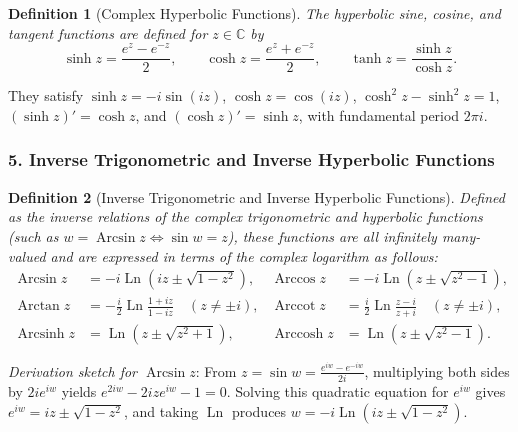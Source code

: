 \documentclass[11pt,a4paper]{article}
\theoremstyle{definitionbreak}
\newtheorem{definition}{Definition}
\theoremstyle{examplebreak}
\theoremstyle{plain}
\begin{document}
\begin{definition}[Complex Hyperbolic Functions]
The hyperbolic sine, cosine, and tangent functions are defined for $z \in \mathbb{C}$ by
\[
    \sinh z = \frac{e^z - e^{-z}}{2}, \qquad \cosh z = \frac{e^z + e^{-z}}{2}, \qquad \tanh z = \frac{\sinh z}{\cosh z}.
\]
\end{definition}

They satisfy $\sinh z = -i\sin(iz)$, $\cosh z = \cos(iz)$, $\cosh^2 z - \sinh^2 z = 1$, $(\sinh z)' = \cosh z$, and $(\cosh z)' = \sinh z$, with fundamental period $2\pi i$.

\subsubsection{5. Inverse Trigonometric and Inverse Hyperbolic Functions}

\begin{definition}[Inverse Trigonometric and Inverse Hyperbolic Functions]
Defined as the inverse relations of the complex trigonometric and hyperbolic functions (such as $w = \operatorname{Arcsin} z \iff \sin w = z$), these functions are all infinitely many-valued and are expressed in terms of the complex logarithm as follows:
\begin{align*}
    \operatorname{Arcsin} z &= -i\operatorname{Ln}\left(iz \pm \sqrt{1 - z^2}\right), & \operatorname{Arccos} z &= -i\operatorname{Ln}\left(z \pm \sqrt{z^2 - 1}\right), \\[6pt]
    \operatorname{Arctan} z &= -\frac{i}{2}\operatorname{Ln}\frac{1 + iz}{1 - iz} \quad (z \neq \pm i), & \operatorname{Arccot} z &= \frac{i}{2}\operatorname{Ln}\frac{z - i}{z + i} \quad (z \neq \pm i), \\[6pt]
    \operatorname{Arcsinh} z &= \operatorname{Ln}\left(z \pm \sqrt{z^2 + 1}\right), & \operatorname{Arccosh} z &= \operatorname{Ln}\left(z \pm \sqrt{z^2 - 1}\right).
\end{align*}
\end{definition}

\textit{Derivation sketch for $\operatorname{Arcsin} z$}: From $z = \sin w = \frac{e^{iw} - e^{-iw}}{2i}$, multiplying both sides by $2ie^{iw}$ yields $e^{2iw} - 2ize^{iw} - 1 = 0$. Solving this quadratic equation for $e^{iw}$ gives $e^{iw} = iz \pm \sqrt{1 - z^2}$, and taking $\operatorname{Ln}$ produces $w = -i\operatorname{Ln}(iz \pm \sqrt{1 - z^2})$.
\end{document}

